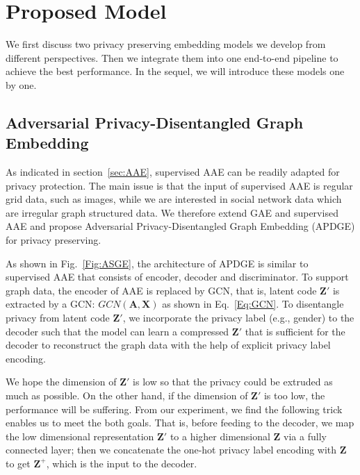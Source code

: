 \documentclass{article}
\begin{document}
\section{Proposed Model}
We first discuss two privacy preserving embedding models we develop from different perspectives. Then we integrate them into one end-to-end pipeline to achieve the best performance. In the sequel, we will introduce these models one by one.


\subsection{Adversarial Privacy-Disentangled Graph Embedding}
As indicated in section~\ref{sec:AAE}, supervised AAE can be readily adapted for privacy protection. The main issue is that the input of supervised AAE is regular grid data, such as images, while we are interested in social network data which are irregular graph structured data. We therefore extend GAE and supervised AAE and propose Adversarial Privacy-Disentangled Graph Embedding (APDGE) for privacy preserving.

As shown in Fig.~\ref{Fig:ASGE}, the architecture of APDGE is similar to supervised AAE that consists of encoder, decoder and discriminator. To support graph data, the encoder of AAE is replaced by GCN, that is, latent code $\mathbf{Z'}$ is extracted by a GCN: $GCN(\mathbf{A},\mathbf{X})$ as shown in Eq.~\ref{Eq:GCN}. To disentangle privacy from latent code $\mathbf{Z'}$, we incorporate the privacy label (e.g., gender) to the decoder such that the model can learn a compressed $\mathbf{Z'}$ that is sufficient for the decoder to reconstruct the graph data with the help of explicit privacy label encoding.

We hope the dimension of $\mathbf{Z}'$ is low so that the privacy could be extruded as much as possible. On the other hand, if the dimension of $\mathbf{Z}'$ is too low, the performance will be suffering. From our experiment, we find the following trick enables us to meet the both goals. That is, before feeding to the decoder, we map the low dimensional representation $\mathbf{Z}'$ to a higher dimensional $\mathbf{Z}$ via a fully connected layer; then we concatenate the one-hot privacy label encoding with $\mathbf{Z}$ to get $\mathbf{Z^+}$, which is the input to the decoder.
\end{document}

